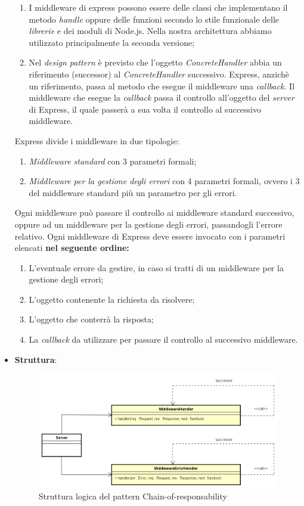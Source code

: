 \begin{itemize}
	\begin{enumerate}
		\item I middleware di express possono essere delle classi che implementano il metodo \textit{handle} oppure delle funzioni secondo lo stile funzionale delle \textit{librerie} e dei moduli di Node.js. Nella nostra architettura abbiamo utilizzato principalmente la seconda versione;
		\item Nel \textit{design pattern} è previsto che l'oggetto \textit{ConcreteHandler} abbia un riferimento (successor) al \textit{ConcreteHandler} successivo. Express, anzichè un riferimento, passa al metodo che esegue il middleware una \textit{callback}. Il middleware che esegue la \textit{callback} passa il controllo all'oggetto del \textit{server} di Express, il quale passerà a sua volta il controllo al successivo middleware.
	\end{enumerate}
Express divide i middleware in due tipologie:
	\begin{enumerate}
		\item \textit{Middleware standard} con 3 parametri formali;
		\item \textit{Middleware per la gestione degli errori} con 4 parametri formali, ovvero i 3 del middleware standard più un parametro per gli errori.
	\end{enumerate}
Ogni middleware può passare il controllo ai middleware standard successivo, oppure ad un middleware per la gestione degli errori, passandogli l'errore relativo. Ogni middleware di Express deve essere invocato con i parametri elencati \textbf{nel seguente ordine:}
	\begin{enumerate}
		\item L'eventuale errore da gestire, in caso si tratti di un middleware per la gestione degli errori;
		\item L'oggetto contenente la richiesta da risolvere;
		\item L'oggetto che conterrà la risposta;
		\item La \textit{callback} da utilizzare per passare il controllo al successivo middleware.
	\end{enumerate}

\item \textbf{Struttura}:
\label{Struttura logica del pattern Chain-of-responsability}
\begin{figure}
	\centering
	\includegraphics[scale=0.50]{UML/strutturaPattern/Chain-of-responsability.png}
	\caption{Struttura logica del pattern Chain-of-responsability}
\end{figure}


\end{itemize}
